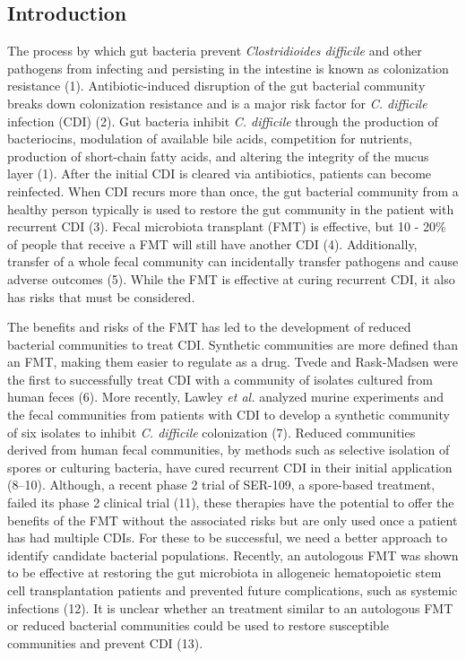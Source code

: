 \documentclass[
  12pt,
]{article}
\begin{document}
\newpage

\hypertarget{introduction}{%
\subsection{Introduction}\label{introduction}}

The process by which gut bacteria prevent \emph{Clostridioides
difficile} and other pathogens from infecting and persisting in the
intestine is known as colonization resistance (1). Antibiotic-induced
disruption of the gut bacterial community breaks down colonization
resistance and is a major risk factor for \emph{C. difficile} infection
(CDI) (2). Gut bacteria inhibit \emph{C. difficile} through the
production of bacteriocins, modulation of available bile acids,
competition for nutrients, production of short-chain fatty acids, and
altering the integrity of the mucus layer (1). After the initial CDI is
cleared via antibiotics, patients can become reinfected. When CDI recurs
more than once, the gut bacterial community from a healthy person
typically is used to restore the gut community in the patient with
recurrent CDI (3). Fecal microbiota transplant (FMT) is effective, but
10 - 20\% of people that receive a FMT will still have another CDI (4).
Additionally, transfer of a whole fecal community can incidentally
transfer pathogens and cause adverse outcomes (5). While the FMT is
effective at curing recurrent CDI, it also has risks that must be
considered.

The benefits and risks of the FMT has led to the development of reduced
bacterial communities to treat CDI. Synthetic communities are more
defined than an FMT, making them easier to regulate as a drug. Tvede and
Rask-Madsen were the first to successfully treat CDI with a community of
isolates cultured from human feces (6). More recently, Lawley \emph{et
al.} analyzed murine experiments and the fecal communities from patients
with CDI to develop a synthetic community of six isolates to inhibit
\emph{C. difficile} colonization (7). Reduced communities derived from
human fecal communities, by methods such as selective isolation of
spores or culturing bacteria, have cured recurrent CDI in their initial
application (8--10). Although, a recent phase 2 trial of SER-109, a
spore-based treatment, failed its phase 2 clinical trial (11), these
therapies have the potential to offer the benefits of the FMT without
the associated risks but are only used once a patient has had multiple
CDIs. For these to be successful, we need a better approach to identify
candidate bacterial populations. Recently, an autologous FMT was shown
to be effective at restoring the gut microbiota in allogeneic
hematopoietic stem cell transplantation patients and prevented future
complications, such as systemic infections (12). It is unclear whether
an treatment similar to an autologous FMT or reduced bacterial
communities could be used to restore susceptible communities and prevent
CDI (13).
\end{document}
